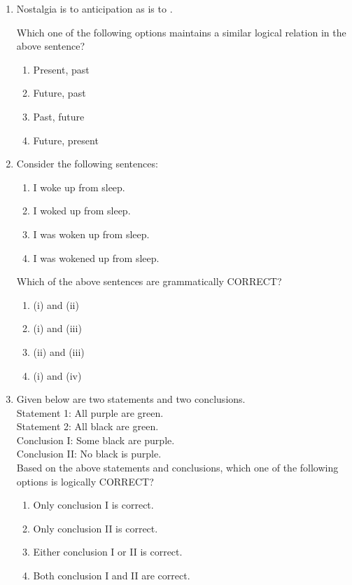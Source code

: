 \documentclass[journal,12pt,onecolumn]{IEEEtran}
\theoremstyle{remark}
\begin{document}
\begin{enumerate}
\item Nostalgia is to anticipation as \underline{\hspace{2cm}} is to \underline{\hspace{2cm}}. 

Which one of the following options maintains a similar logical relation in the above sentence?
\begin{multicols}{4}
\begin{enumerate}
\item Present, past
\item Future, past
\item Past, future
\item Future, present
\end{enumerate}
\end{multicols}
\hfill {}

\item Consider the following sentences:  
\begin{enumerate}[label=(\roman*)]
    \item I woke up from sleep.
    \item I woked up from sleep.  
    \item I was woken up from sleep.  
    \item I was wokened up from sleep.  
\end{enumerate}
Which of the above sentences are grammatically CORRECT?
\begin{multicols}{4}
\begin{enumerate}
\item (i) and (ii)
\item (i) and (iii)
\item (ii) and (iii)
\item (i) and (iv)
\end{enumerate}
\end{multicols}
\hfill {}

\item Given below are two statements and two conclusions.  \\
Statement 1: All purple are green.  \\
Statement 2: All black are green.  \\
Conclusion I: Some black are purple.  \\
Conclusion II: No black is purple. \\ 
Based on the above statements and conclusions, which one of the following options is logically CORRECT?
\begin{multicols}{2}
\begin{enumerate}
\item Only conclusion I is correct.
\item Only conclusion II is correct.
\item Either conclusion I or II is correct.
\item Both conclusion I and II are correct.
\end{enumerate}
\end{multicols}
\hfill {}


\end{enumerate}
\end{document}
